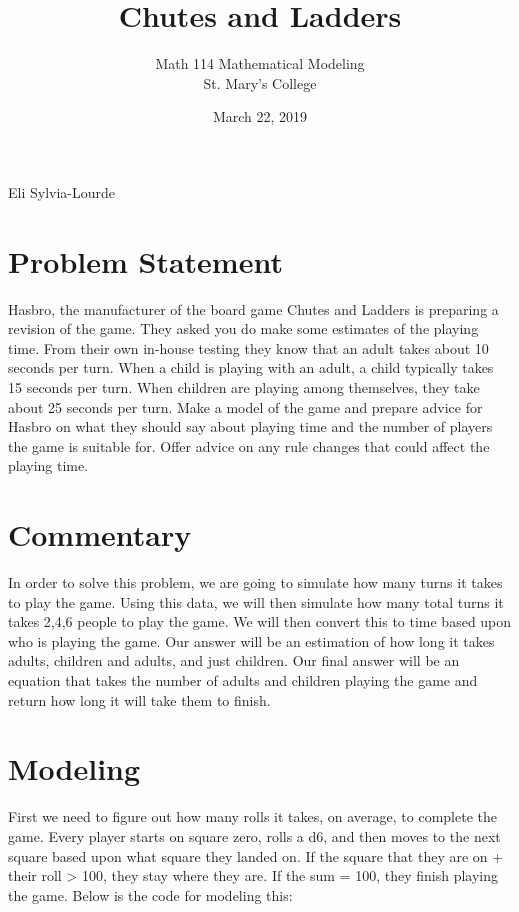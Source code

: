 \documentclass[12pt]{article} %
\title{Chutes and Ladders}
\author{Math 114 Mathematical Modeling\\St. Mary's College}
\date{March 22, 2019}
\newcommand{\authors}{Eli Sylvia-Lourde}
\begin{document}
\hfill\authors %
{\let\newpage\relax\maketitle} %

\section*{Problem Statement}
Hasbro,	the	manufacturer	of	the	board	game	Chutes	and	Ladders is	preparing	a	revision	of	the
game.	They	asked	you	do	make	some	estimates	of	the	playing	time.	From	their	own	in-house
testing	they	know	that	an	adult	takes	about	10	seconds	per	turn.	When	a	child	is	playing	with
an	adult,	a	child	typically	takes	15	seconds	per	turn.	When	children	are	playing	among
themselves,	they	take	about	25	seconds	per	turn.
Make	a	model	of	the	game	and	prepare	advice	for	Hasbro	on	what	they	should	say	about
playing	time	and	the	number	of	players	the	game	is	suitable	for.	Offer	advice	on	any	rule
changes	that	could	affect	the	playing	time.

\section*{Commentary}
In order to solve this problem, we are going to simulate how many turns it takes to play the game. Using this data, we will then simulate how many total turns it takes 2,4,6 people to play the game. We will then convert this to time based upon who is playing the game. Our answer will be an estimation of how long it takes adults, children and adults, and just children. Our final answer will be an equation that takes the number of adults and children playing the game and return how long it will take them to finish.

\section*{Modeling}
First we need to figure out how many rolls it takes, on average, to complete the game. Every player starts on square zero, rolls a d6, and then moves to the next square based upon what square they landed on. If the square that they are on + their roll > 100, they stay where they are. If the sum = 100, they finish playing the game. Below is the code for modeling this:
\end{document}
